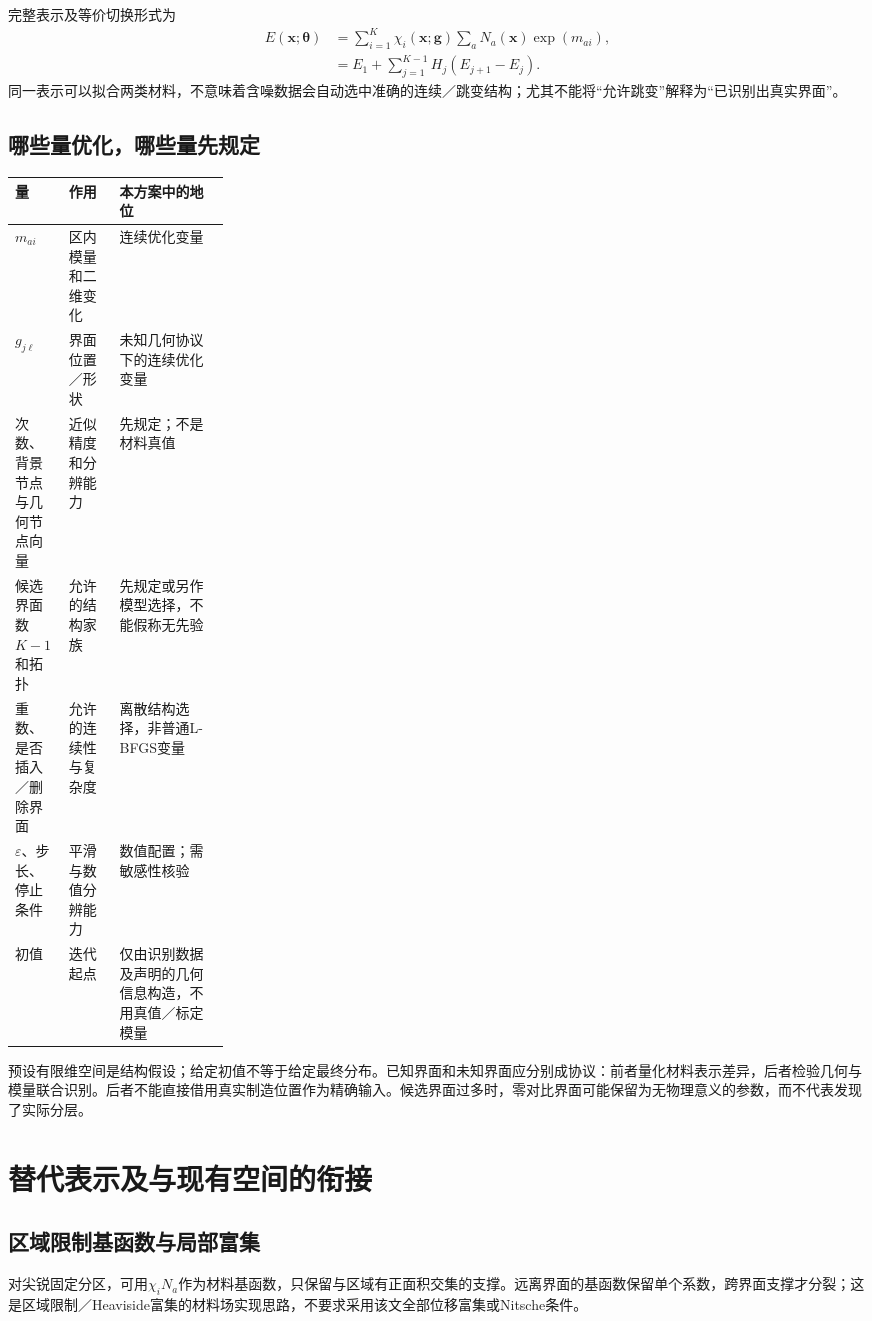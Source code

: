 \documentclass[11pt,a4paper]{ctexart}
\newcommand{\btheta}{\boldsymbol\theta}
\begin{document}
完整表示及等价切换形式为
\begin{align}
 E(\mathbf x;\btheta)&=\sum_{i=1}^{K}\chi_i(\mathbf x;\mathbf g)
                         \sum_aN_a(\mathbf x)\exp(m_{ai}), \label{eq:unified}\\
 &=E_1+\sum_{j=1}^{K-1}H_j(E_{j+1}-E_j). \label{eq:switch}
\end{align}
同一表示可以拟合两类材料，不意味着含噪数据会自动选中准确的连续／跳变结构；尤其不能将“允许跳变”解释为“已识别出真实界面”。

\subsection{哪些量优化，哪些量先规定}
\begin{center}
\small
\begin{tabularx}{\linewidth}{@{}p{0.25\linewidth}XX@{}}
\toprule
量 & 作用 & 本方案中的地位\\\midrule
$m_{ai}$ & 区内模量和二维变化 & 连续优化变量\\
$g_{j\ell}$ & 界面位置／形状 & 未知几何协议下的连续优化变量\\
次数、背景节点与几何节点向量 & 近似精度和分辨能力 & 先规定；不是材料真值\\
候选界面数$K-1$和拓扑 & 允许的结构家族 & 先规定或另作模型选择，不能假称无先验\\
重数、是否插入／删除界面 & 允许的连续性与复杂度 & 离散结构选择，非普通L-BFGS变量\\
$\varepsilon$、步长、停止条件 & 平滑与数值分辨能力 & 数值配置；需敏感性核验\\
初值 & 迭代起点 & 仅由识别数据及声明的几何信息构造，不用真值／标定模量\\
\bottomrule
\end{tabularx}
\end{center}
预设有限维空间是结构假设；给定初值不等于给定最终分布。已知界面和未知界面应分别成协议：前者量化材料表示差异，后者检验几何与模量联合识别。后者不能直接借用真实制造位置作为精确输入。候选界面过多时，零对比界面可能保留为无物理意义的参数，而不代表发现了实际分层。

\section{替代表示及与现有空间的衔接}
\subsection{区域限制基函数与局部富集}
对尖锐固定分区，可用$\chi_iN_a$作为材料基函数，只保留与区域有正面积交集的支撑。远离界面的基函数保留单个系数，跨界面支撑才分裂；这是区域限制／Heaviside富集的材料场实现思路\cite{noel2022}，不要求采用该文全部位移富集或Nitsche条件。
\end{document}
